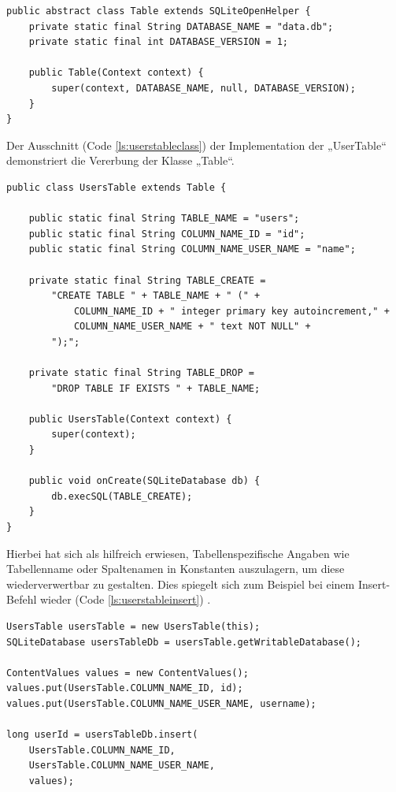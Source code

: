 \begin{lstlisting}[label=ls:abstracttableclass,caption=Abstrakte Klasse „Table“]
public abstract class Table extends SQLiteOpenHelper {
	private static final String DATABASE_NAME = "data.db";
	private static final int DATABASE_VERSION = 1;

	public Table(Context context) {
		super(context, DATABASE_NAME, null, DATABASE_VERSION);
	}
}
\end{lstlisting}

Der Ausschnitt (Code \ref{ls:userstableclass}) der Implementation der „UserTable“ demonstriert die Vererbung der Klasse „Table“.

\begin{lstlisting}[label=ls:userstableclass,caption=Ausschnitt aus der Klasse „UsersTable“]
public class UsersTable extends Table {

	public static final String TABLE_NAME = "users";
	public static final String COLUMN_NAME_ID = "id";
	public static final String COLUMN_NAME_USER_NAME = "name";

	private static final String TABLE_CREATE =
		"CREATE TABLE " + TABLE_NAME + " (" +
			COLUMN_NAME_ID + " integer primary key autoincrement," +
			COLUMN_NAME_USER_NAME + " text NOT NULL" +
		");";

	private static final String TABLE_DROP =
		"DROP TABLE IF EXISTS " + TABLE_NAME;

	public UsersTable(Context context) {
		super(context);
	}

	public void onCreate(SQLiteDatabase db) {
		db.execSQL(TABLE_CREATE);
	}
}
\end{lstlisting}

Hierbei hat sich als hilfreich erwiesen, Tabellenspezifische Angaben wie Tabellenname oder Spaltenamen in Konstanten auszulagern, um diese wiederverwertbar zu gestalten. Dies spiegelt sich zum Beispiel bei einem Insert-Befehl wieder (Code \ref{ls:userstableinsert}) .

\begin{lstlisting}[label=ls:userstableinsert,caption=Exemplarisches Insert in die „UsersTable“]
UsersTable usersTable = new UsersTable(this);
SQLiteDatabase usersTableDb = usersTable.getWritableDatabase();

ContentValues values = new ContentValues();
values.put(UsersTable.COLUMN_NAME_ID, id);
values.put(UsersTable.COLUMN_NAME_USER_NAME, username);

long userId = usersTableDb.insert(
	UsersTable.COLUMN_NAME_ID,
	UsersTable.COLUMN_NAME_USER_NAME,
	values);
\end{lstlisting}

